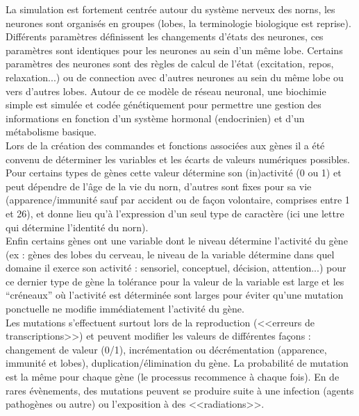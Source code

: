 \documentclass[11pt,twoside,a4paper]{article}
\begin{document}
La simulation est fortement centr{\'e}e autour du syst{\`e}me nerveux des norns, les neurones sont organis{\'e}s en groupes (lobes, la terminologie biologique est reprise). Diff{\'e}rents param{\`e}tres d{\'e}finissent les changements d'{\'e}tats des neurones, ces param{\`e}tres sont identiques pour les neurones au sein d'un m{\^e}me lobe. Certains param{\`e}tres des neurones sont des r{\`e}gles de calcul de l'{\'e}tat (excitation, repos, relaxation...) ou de connection avec d'autres neurones au sein du m{\^e}me lobe ou vers d'autres lobes. Autour de ce mod{\`e}le de r{\'e}seau neuronal, une biochimie simple est simul{\'e}e et cod{\'e}e g{\'e}n{\'e}tiquement pour permettre une gestion des informations en fonction d'un syst{\`e}me hormonal (endocrinien) et d'un m{\'e}tabolisme basique.~\\

Lors de la cr{\'e}ation des commandes et fonctions associ{\'e}es aux g{\`e}nes il a {\'e}t{\'e} convenu de d{\'e}terminer les variables et les {\'e}carts de valeurs num{\'e}riques possibles. Pour certains types de g{\`e}nes cette valeur d{\'e}termine son (in)activit{\'e} (0 ou 1) et peut d{\'e}pendre de l'{\^a}ge de la vie du norn, d'autres sont fixes pour sa vie (apparence/immunit{\'e} sauf par accident ou de fa\c{c}on volontaire, comprises entre 1 et 26), et donne lieu qu'{\`a} l'expression d'un seul type de caract{\`e}re (ici une lettre qui d{\'e}termine l'identit{\'e} du norn).~\\

Enfin certains g{\`e}nes ont une variable dont le niveau d{\'e}termine l'activit{\'e} du g{\`e}ne (ex : g{\`e}nes des lobes du cerveau, le niveau de la variable d{\'e}termine dans quel domaine il exerce son activit{\'e} : sensoriel, conceptuel, d{\'e}cision, attention...) pour ce dernier type de g{\`e}ne la tol{\'e}rance pour la valeur de la variable est large et les ``cr{\'e}neaux'' o{\`u} l'activit{\'e} est d{\'e}termin{\'e}e sont larges pour {\'e}viter qu'une mutation ponctuelle ne modifie imm{\'e}diatement l'activit{\'e} du g{\`e}ne.~\\

Les mutations s'effectuent surtout lors de la reproduction (<<erreurs de transcriptions>>) et peuvent modifier les valeurs de diff{\'e}rentes fa\c{c}ons : changement de valeur (0/1), incr{\'e}mentation ou d{\'e}cr{\'e}mentation (apparence, immunit{\'e} et lobes), duplication/{\'e}limination du g{\`e}ne. La probabilit{\'e} de mutation est la m{\^e}me pour chaque g{\`e}ne (le processus recommence {\`a} chaque fois). En de rares {\'e}v{\`e}nements, des mutations peuvent se produire suite {\`a} une infection (agents pathog{\`e}nes ou autre) ou l'exposition {\`a} des <<radiations>>.~\\
\end{document}
